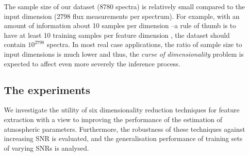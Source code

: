 \documentclass[a4paper,fleqn,usenatbib]{mnras}
\begin{document}
%

The sample size of our dataset (8780 spectra) is relatively
small compared to the input dimension (2798 flux measurements
per spectrum). For example, with an amount of information 
about 10 samples per dimension --a rule of thumb is to have at 
least 10 training samples per feature dimension \citep{jain:00}, 
the dataset should contain $10^{2798}$ spectra.
In most real case applications, the ratio of sample size to input 
dimensions is much lower and thus, the \textit{curse of dimensionality} 
problem is expected to affect even more severely the inference process. 


\subsection{The experiments}
\label{sec:modelling}

We investigate the utility of six dimensionality reduction techniques
for feature extraction with a view to improving the performance of the
estimation of atmospheric parameters. Furthermore, the robustness of
these techniques against increasing SNR is evaluated, and the
generalisation performance of training sets of varying SNRs is
analysed.
\end{document}
